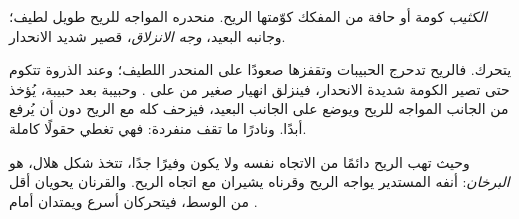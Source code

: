 \begin{definition}[الكثيب]\label{def:g9:landforms:dune}
\emph{الكثيب} كومة أو حافة من  المفكك كوّمتها الريح.
منحدره المواجه للريح طويل لطيف؛ وجانبه البعيد،
\emph{وجه الانزلاق}، قصير شديد الانحدار.
\end{definition}

 يتحرك. فالريح تدحرج الحبيبات وتقفزها صعودًا على المنحدر اللطيف؛
وعند الذروة تتكوم حتى تصير الكومة شديدة الانحدار، فينزلق انهيار صغير من
 على . وحبيبة بعد حبيبة، يُؤخذ  من الجانب المواجه
للريح ويوضع على الجانب البعيد، فيزحف  كله مع الريح دون أن يُرفع
أبدًا. ونادرًا ما تقف  منفردة: فهي تغطي حقولًا
كاملة.

وحيث تهب الريح دائمًا من الاتجاه نفسه ولا يكون  وفيرًا جدًا، تتخذ
 شكل هلال، هو \emph{البرخان}: أنفه المستدير يواجه الريح وقرناه
يشيران مع اتجاه الريح. والقرنان يحويان  أقل من الوسط، فيتحركان
أسرع ويمتدان أمام .

